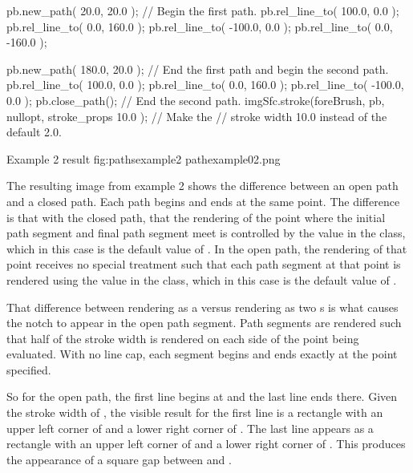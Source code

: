 \begin{codeblock}
  pb.new_path({ 20.0, 20.0 }); // Begin the first path.
  pb.rel_line_to({ 100.0, 0.0 });
  pb.rel_line_to({ 0.0, 160.0 });
  pb.rel_line_to({ -100.0, 0.0 });
  pb.rel_line_to({ 0.0, -160.0 });
  
  pb.new_path({ 180.0, 20.0 }); // End the first path and begin the second path.
  pb.rel_line_to({ 100.0, 0.0 });
  pb.rel_line_to({ 0.0, 160.0 });
  pb.rel_line_to({ -100.0, 0.0 });
  pb.close_path(); // End the second path.
  imgSfc.stroke(foreBrush, pb, nullopt, stroke_props{ 10.0 }); // Make the
    // stroke width 10.0 instead of the default 2.0.
\end{codeblock}

\begin{importgraphiciotwod}
{Example 2 result}
{fig:pathsexample2}
{pathexample02.png}
\end{importgraphiciotwod}

\FloatBarrier

\pnum
The resulting image from example 2 shows the difference between an open path and a closed path. Each path begins and ends at the same point. The difference is that with the closed path, that the rendering of the point where the initial path segment and final path segment meet is controlled by the  value in the  class, which in this case is the default value of . In the open path, the rendering of that point receives no special treatment such that each path segment at that point is rendered using the  value in the  class, which in this case is the default value of .

\pnum
That difference between rendering as a  versus rendering as two s is what causes the notch to appear in the open path segment. Path segments are rendered such that half of the stroke width is rendered on each side of the point being evaluated. With no line cap, each segment begins and ends exactly at the point specified.

\pnum
So for the open path, the first line begins at  and the last line ends there. Given the stroke width of , the visible result for the first line is a rectangle with an upper left corner of  and a lower right corner of . The last line appears as a rectangle with an upper left corner of  and a lower right corner of . This produces the appearance of a square gap between  and .


